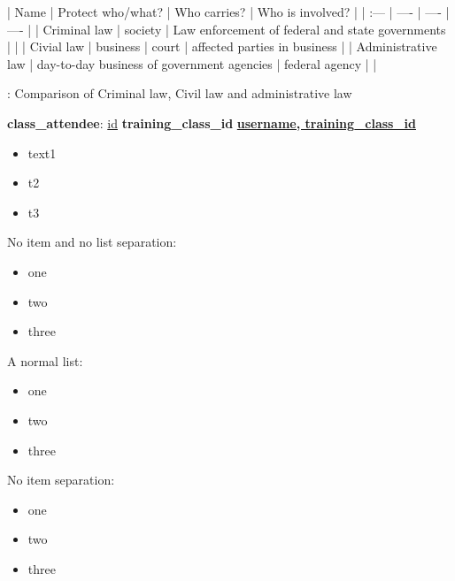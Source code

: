 \documentclass{report}
\begin{document}
\begin{markdown}

| Name | Protect who/what? | Who carries? | Who is involved? |
| :--- | ---- | ---- | ---- |
| Criminal law | society | Law enforcement of federal and state governments | |
| Civial law | business | court | affected parties  in business | 
| Administrative law | day-to-day business of government agencies | federal agency | |

: Comparison of Criminal law, Civil law and administrative law

\end{markdown}

\textbf{class\_attendee}: \underline{id}
\newline
\textbf{training\_class\_id}
\newline
\textbf{\underline{username, training\_class\_id}}

\begin{itemize}
  \item text1
  \item t2
  \item t3
\end{itemize}

No item and no list separation:

\begin{itemize}[noitemsep]
    \item one
    \item two
    \item three
\end{itemize}


A normal list:
\begin{itemize}
    \item one
    \item two
    \item three
\end{itemize}

No item separation:
\begin{itemize}[nosep]
    \item one
    \item two
    \item three
\end{itemize}
\end{document}
